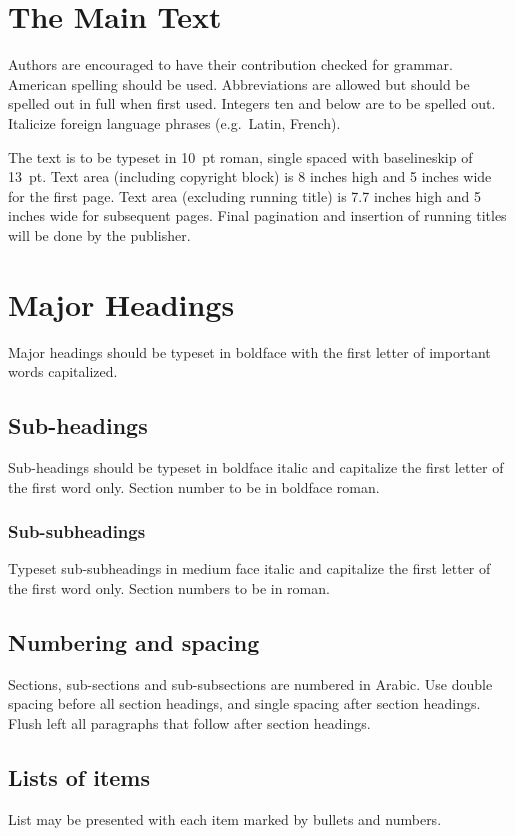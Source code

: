 \documentclass{ws-ijprai}
\begin{document}
\section{The Main Text}
Authors are encouraged to have their contribution checked for grammar. American spelling should be used. Abbreviations are allowed but should be spelled out in full when first used. Integers ten and below are to be spelled out. Italicize foreign language phrases (e.g.~Latin, French).

The text is to be typeset in 10~pt roman, single spaced with baselineskip of 13~pt. Text area (including copyright block) is 8 inches high and 5 inches wide for the first page. Text area (excluding running title) is 7.7 inches high and 5 inches wide for subsequent pages. Final pagination and insertion of running titles will be done by the publisher.

\section{Major Headings}
Major headings should be typeset in boldface with the first letter of important words capitalized.

\subsection{Sub-headings}
Sub-headings should be typeset in boldface italic and capitalize the first letter of the first word only. Section number to be in boldface roman.

\subsubsection{Sub-subheadings}
Typeset sub-subheadings in medium face italic and capitalize the first letter of the first word only. Section numbers to be in roman.

\subsection{Numbering and spacing}
Sections, sub-sections and sub-subsections are numbered in Arabic.  Use double spacing before all section headings, and single spacing after section headings. Flush left all paragraphs that follow after section headings.

\subsection{Lists of items}
List may be presented with each item marked by bullets and numbers.
\end{document}
